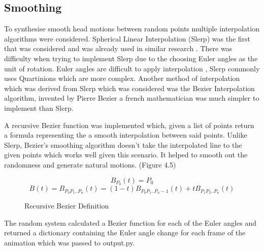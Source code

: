 \documentclass[bsc,frontabs,twoside,singlespacing,parskip]{infthesis}
\begin{document}
\subsection{Smoothing}

To synthesise smooth head motions between random points multiple interpolation algorithms were considered. Spherical Linear Interpolation (Slerp) was the first that was considered and was already used in similar research \cite{rigid_head_motion}. There was difficulty when trying to implement Slerp due to the choosing Euler angles as the unit of rotation. Euler angles are difficult to apply interpolation \cite{quartionions}, Slerp commonly uses Quartinions which are more complex. Another method of interpolation which was derived from Slerp which was considered was the Bezier Interpolation algorithm, invented by Pierre Bezier a french mathematician was much simpler to implement than Slerp.

A recursive Bezier function was implemented which, given a list of points return a formula representing the a smooth interpolation between said points. Unlike Slerp, Bezier's smoothing algorithm doesn't take the interpolated line to the given points which works well given this scenario. It helped to smooth out the randomness and generate natural motions. (Figure 4.5)

\begin{figure}
	$$ B_{P_0}(t) = P_0 $$
	$$ B(t) = B_{P_0P_1..P_n}(t) = (1-t) B_{P_0P_1..P_n-1}(t) + tB_{P_1P_2..P_n} (t)$$
	\caption{Recursive Bezier Definition} 
\end{figure}

The random system calculated a Bezier function for each of the Euler angles and returned a dictionary containing the Euler angle change for each frame of the animation which was passed to output.py.

\end{document}
